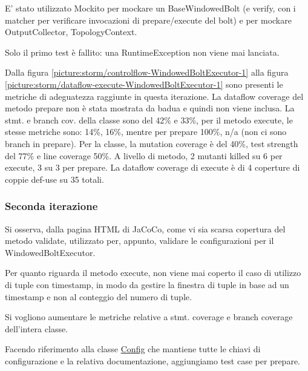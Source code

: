 \documentclass[10pt, a4paper]{article}
\newcommand{\getpicturelabel}[1]{picture:#1}
\begin{document}
	E' stato utilizzato Mockito per mockare un BaseWindowedBolt (e verify, con i matcher per verificare invocazioni di
	prepare/execute del bolt) e per mockare OutputCollector, TopologyContext.
	
	Solo il primo test è fallito: una RuntimeException non viene mai lanciata.
	
	Dalla figura \ref{\getpicturelabel{storm/controlflow-WindowedBoltExecutor-1}} alla figura 
	\ref{\getpicturelabel{storm/dataflow-execute-WindowedBoltExecutor-1}} sono presenti le metriche di adeguatezza 
	raggiunte in questa iterazione. La dataflow coverage del metodo prepare non è stata mostrata da badua e quindi
	non viene inclusa. La stmt. e branch cov. della classe sono del 42\% e 33\%, per il metodo execute, le stesse metriche sono:
	14\%, 16\%, mentre per prepare 100\%, n/a (non ci sono branch in prepare). Per la classe, la mutation coverage è del 40\%,
	test strength del 77\% e line coverage 50\%. A livello di metodo, 2 mutanti killed su 6 per execute, 3 su 3 per prepare.
	La dataflow coverage di execute è di 4 coperture di coppie def-use su 35 totali.
	
	\subsubsection{Seconda iterazione}
	Si osserva, dalla pagina HTML di JaCoCo, come vi sia scarsa copertura del metodo validate, utilizzato per, appunto,
	validare le configurazioni per il WindowedBoltExecutor.
	
	Per quanto riguarda il metodo execute, non viene mai coperto il caso di utilizzo di tuple con timestamp, in modo da
	gestire la finestra di tuple in base ad un timestamp e non al conteggio del numero di tuple.
	
	Si vogliono aumentare le metriche relative a stmt. coverage e branch coverage dell'intera classe.
	
	Facendo riferimento alla classe \href{https://storm.apache.org/releases/2.6.2/javadocs/org/apache/storm/Config.html}{Config}
	che mantiene tutte le chiavi di configurazione e la relativa documentazione, aggiungiamo test case per prepare.
	
\end{document}
